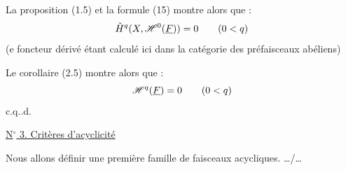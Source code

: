 La proposition (1.5) et la formule (15) montre alors que :
\[
 \check{H}^q(X,\mathscr H^0(\underline F))=0\qquad(0<q)
\]
(e foncteur dérivé étant calculé ici dans la catégorie des préfaisceaux abéliens)

Le corollaire (2.5) montre alors que :
\[
 \mathscr H^q(\underline F)=0\qquad(0<q)
\]
\hfill c.q..d.

\begin{center}\uline{N$^\circ$ 3. Critères d'acyclicité}\end{center}

Nous allons définir une première famille de faisceaux acycliques.
\hfill \ldots/\ldots

